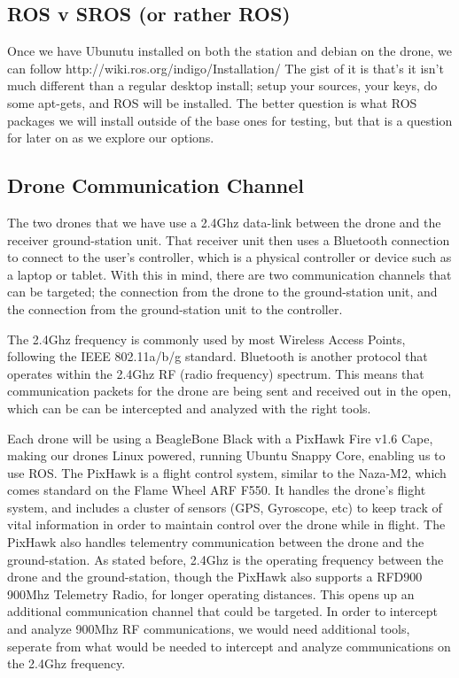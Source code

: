 \documentclass[IEEEtran,letterpaper,10pt,titlepage,draftclsnofoot,onecolumn]{article}
\begin{document}
\subsection*{ROS v SROS (or rather ROS)}
Once we have Ubunutu installed on both the station and debian on the drone, we can follow 
http://wiki.ros.org/indigo/Installation/
The gist of it is that's it isn't much different than a regular desktop install; setup your sources, your keys, do some
apt-gets, and ROS will be installed. The better question is what ROS packages we will install outside of the base ones for 
testing, but that is a question for later on as we explore our options.

\subsection*{Drone Communication Channel}
The two drones that we have use a 2.4Ghz data-link between the drone and the receiver ground-station unit.
That receiver unit then uses a Bluetooth connection to connect to the user's controller, which is a physical controller
or device such as a laptop or tablet.\cite{NazaM2} With this in mind, there are two communication channels that can be
targeted; the connection from the drone to the ground-station unit, and the connection from the ground-station unit
to the controller\cite{NazaM2}.

The 2.4Ghz frequency is commonly used by most Wireless Access Points, following the IEEE 802.11a/b/g
standard. Bluetooth is another protocol that operates within the 2.4Ghz RF (radio frequency)
spectrum\cite{HakDaSpectrum}. This means that communication packets for the drone are being sent and received out in the
open, which can be can be intercepted and analyzed with the right tools.

Each drone will be using a BeagleBone Black with a PixHawk Fire v1.6 Cape, making our drones Linux powered, running
Ubuntu Snappy Core, enabling us to use ROS\cite{PixHawk}. The PixHawk is a flight control system, similar to the
Naza-M2, which comes standard on the Flame Wheel ARF F550. It handles the drone's flight system, and includes a cluster
of sensors (GPS, Gyroscope, etc) to keep track of vital information in order to maintain control over the drone while
in flight. The PixHawk also handles telementry communication between the drone and the ground-station. As stated before,
2.4Ghz is the operating frequency between the drone and the ground-station, though the PixHawk also supports a RFD900
900Mhz Telemetry Radio, for longer operating distances\cite{PixHawkDocs}. This opens up an additional communication
channel that could be targeted. In order to intercept and analyze 900Mhz RF communications, we would need additional
tools, seperate from what would be needed to intercept and analyze communications on the 2.4Ghz
frequency\cite{HakDaSpectrum900}.
\end{document}
